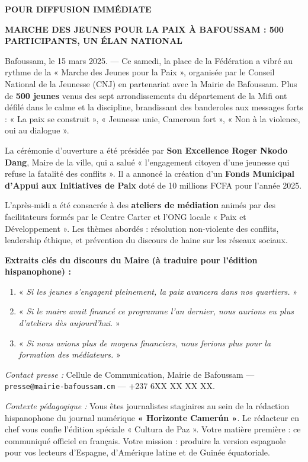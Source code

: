 \documentclass[11pt]{article}
\newcounter{popsec}
\newcounter{popsub}
\newcommand{\courssub}[1]{%
  \stepcounter{popsub}%
  \par\vspace{9pt}\noindent{\popxbold\fontsize{11.5}{13}\selectfont\color{popink}{\color{poporange}\thepopsec.\thepopsub}\hspace{6pt}#1}\par\nopagebreak\vspace{4pt}
}
\begin{document}
\courssub{Situation}
\begin{textebox}
\textbf{POUR DIFFUSION IMMÉDIATE}

\textbf{MARCHE DES JEUNES POUR LA PAIX À BAFOUSSAM : 500 PARTICIPANTS, UN ÉLAN NATIONAL}

Bafoussam, le 15 mars 2025. — Ce samedi, la place de la Fédération a vibré au rythme de la « Marche des Jeunes pour la Paix », organisée par le Conseil National de la Jeunesse (CNJ) en partenariat avec la Mairie de Bafoussam. Plus de \textbf{500 jeunes} venus des sept arrondissements du département de la Mifi ont défilé dans le calme et la discipline, brandissant des banderoles aux messages forts : « La paix se construit », « Jeunesse unie, Cameroun fort », « Non à la violence, oui au dialogue ».

La cérémonie d'ouverture a été présidée par \textbf{Son Excellence Roger Nkodo Dang}, Maire de la ville, qui a salué « l'engagement citoyen d'une jeunesse qui refuse la fatalité des conflits ». Il a annoncé la création d'un \textbf{Fonds Municipal d'Appui aux Initiatives de Paix} doté de 10 millions FCFA pour l'année 2025.

L'après-midi a été consacrée à des \textbf{ateliers de médiation} animés par des facilitateurs formés par le Centre Carter et l'ONG locale « Paix et Développement ». Les thèmes abordés : résolution non-violente des conflits, leadership éthique, et prévention du discours de haine sur les réseaux sociaux.

\textbf{Extraits clés du discours du Maire (à traduire pour l'édition hispanophone) :}
\begin{enumerate}
    \item « \emph{Si les jeunes s'engagent pleinement, la paix avancera dans nos quartiers.} »
    \item « \emph{Si le maire avait financé ce programme l'an dernier, nous aurions eu plus d'ateliers dès aujourd'hui.} »
    \item « \emph{Si nous avions plus de moyens financiers, nous ferions plus pour la formation des médiateurs.} »
\end{enumerate}

\textit{Contact presse :} Cellule de Communication, Mairie de Bafoussam — \texttt{presse@mairie-bafoussam.cm} — +237 6XX XX XX XX.
\end{textebox}

\emph{Contexte pédagogique :} Vous êtes journalistes stagiaires au sein de la rédaction hispanophone du journal numérique \textbf{« Horizonte Camerún »}. Le rédacteur en chef vous confie l'édition spéciale « Cultura de Paz ». Votre matière première : ce communiqué officiel en français. Votre mission : produire la version espagnole pour vos lecteurs d'Espagne, d'Amérique latine et de Guinée équatoriale.
\end{document}
